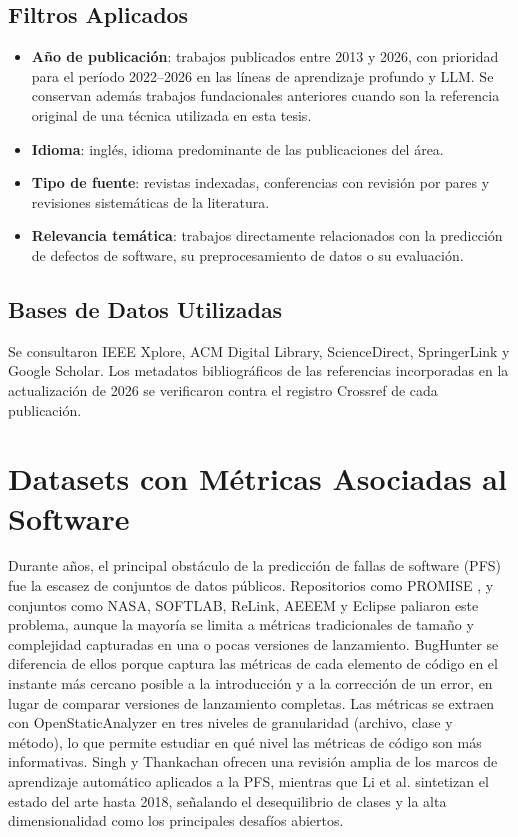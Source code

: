 \subsection{Filtros Aplicados}

\begin{itemize}
    \item \textbf{Año de publicación}: trabajos publicados entre 2013 y 2026, con prioridad para el período 2022--2026 en las líneas de aprendizaje profundo y LLM. Se conservan además trabajos fundacionales anteriores cuando son la referencia original de una técnica utilizada en esta tesis.
    \item \textbf{Idioma}: inglés, idioma predominante de las publicaciones del área.
    \item \textbf{Tipo de fuente}: revistas indexadas, conferencias con revisión por pares y revisiones sistemáticas de la literatura.
    \item \textbf{Relevancia temática}: trabajos directamente relacionados con la predicción de defectos de software, su preprocesamiento de datos o su evaluación.
\end{itemize}

\subsection{Bases de Datos Utilizadas}

Se consultaron IEEE Xplore, ACM Digital Library, ScienceDirect, SpringerLink y Google Scholar. Los metadatos bibliográficos de las referencias incorporadas en la actualización de 2026 se verificaron contra el registro Crossref de cada publicación.

\section{Datasets con Métricas Asociadas al Software}

Durante años, el principal obstáculo de la predicción de fallas de software (PFS) fue la escasez de conjuntos de datos públicos. Repositorios como PROMISE \cite{Sayyad-Shirabad+Menzies:2005}, y conjuntos como NASA, SOFTLAB, ReLink, AEEEM y Eclipse \cite{shepperd2013data,d2012evaluating,wu2011relink,zimmermann2007predicting,kim2011dealing} paliaron este problema, aunque la mayoría se limita a métricas tradicionales de tamaño y complejidad capturadas en una o pocas versiones de lanzamiento. BugHunter \cite{ferenc_automatically_2020} se diferencia de ellos porque captura las métricas de cada elemento de código en el instante más cercano posible a la introducción y a la corrección de un error, en lugar de comparar versiones de lanzamiento completas. Las métricas se extraen con OpenStaticAnalyzer \cite{openstaticanalyzergithubio} en tres niveles de granularidad (archivo, clase y método), lo que permite estudiar en qué nivel las métricas de código son más informativas. Singh y Thankachan \cite{9397136} ofrecen una revisión amplia de los marcos de aprendizaje automático aplicados a la PFS, mientras que Li et al. \cite{li_progress_2018} sintetizan el estado del arte hasta 2018, señalando el desequilibrio de clases y la alta dimensionalidad como los principales desafíos abiertos.

